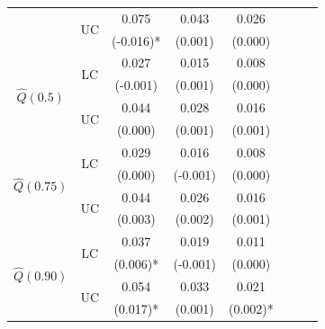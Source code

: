 \begin{table}
\begin{center}
\begin{tabular}{| c | c | c | c |  c | c | c | c |}
						& \multirow{2}{*}{UC}			& 0.075			& 0.043	& 0.026	\\
						&						& (-0.016)*		& (0.001)	& (0.000)	\\
	
	\hline


	\multirow{4}{*}{$\hat Q(0.5)$}	& \multirow{2}{*}{LC}		& 0.027		& 0.015	& 0.008	\\
						&						& (-0.001)		& (0.001)	& (0.000)	\\	
	
						\cline{2- 5}
	
						& \multirow{2}{*}{UC}			& 0.044		& 0.028	& 0.016	\\
						&						& (0.000)		& (0.001)	& (0.001)	\\
	
	\hline										
	
	\multirow{4}{*}{$\hat Q(0.75)$}	& \multirow{2}{*}{LC}		& 0.029		& 0.016	& 0.008	\\
						&						& (0.000)		& (-0.001)	& (0.000)	\\	
	
						\cline{2- 5}
	
						& \multirow{2}{*}{UC}			& 0.044		& 0.026	& 0.016	\\
						&						& (0.003)		& (0.002)	& (0.001)	\\
	\hline

	\multirow{4}{*}{$\hat Q(0.90)$}	& \multirow{2}{*}{LC}		& 0.037		& 0.019	& 0.011	\\
						&						& (0.006)*		& (-0.001)	& (0.000)	\\	
	
	
						\cline{2- 5}
	
						& \multirow{2}{*}{UC}		& 0.054		& 0.033	& 0.021	\\
						&					& (0.017)*		& (0.001)	& (0.002)*	\\

		

\hline



\hline

\hline


\end{tabular}
\end{center}
\end{table}





